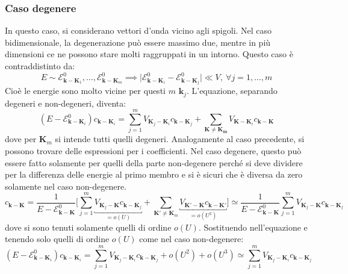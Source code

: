 \documentclass[10pt, a4paper]{scrartcl}
\numberwithin{equation}{subsection}
\theoremstyle{style1}
\begin{document}
\subsubsection{Caso degenere}

In questo caso, si considerano vettori d'onda vicino agli spigoli. Nel caso bidimensionale, la degenerazione pu\`o essere massimo due, mentre in pi\`u dimensioni ce ne possono stare molti raggruppati in un intorno. Questo caso \`e contraddistinto da:
\begin{equation}
	E \sim \mathscr{E}^0_{\mathbf{k} - \mathbf{K} _1} , \ldots, \mathscr{E}^0_{\mathbf{k} -\mathbf{K} _m} \implies \lvert \mathscr{E}^0_{\mathbf{k} - \mathbf{K} _i} - \mathscr{E}^0_{\mathbf{k} - \mathbf{K} _j}  \rvert \ll V ,  \ \forall j=1,\ldots,m  
\end{equation}
Cio\`e le energie sono molto vicine per questi $m$ $\mathbf{k} _j$. L'equazione, separando degeneri e non-degeneri, diventa:
\begin{equation}
	(E-\mathscr{E}^0_{\mathbf{k} -\mathbf{K} _i}) c_{\mathbf{k} -\mathbf{K} _i} = \sum_{j=1}^{m} V_{\mathbf{K} _j - \mathbf{K} _i} c_{\mathbf{k} -\mathbf{K} _j} + \sum_{\mathbf{K} \neq \mathbf{K_m} }^{} V_{\mathbf{K} -\mathbf{K} _i} c_{\mathbf{k} -\mathbf{K} } 
\end{equation}
dove per $\mathbf{K} _m$ si intende tutti quelli degeneri. Analogamente al caso precedente, si possono trovare delle espressioni per i coefficienti. Nel caso degenere, questo pu\`o essere fatto solamente per quelli della parte non-degenere perch\'e si deve dividere per la differenza delle energie al primo membro e si \`e sicuri che \`e diversa da zero solamente nel caso non-degenere.
\begin{equation}
	c_{\mathbf{k} -\mathbf{K} } = \frac{1}{E- \mathscr{E}^0_{\mathbf{k} - \mathbf{K} } } \Bigg[ \sum_{j=1}^{m}\underbracket{ V_{\mathbf{K} _j - \mathbf{K}} c_{\mathbf{k} -\mathbf{K} _j}}_{=o(U)}   + \sum_{\mathbf{K}' \neq \mathbf{K} _m}^{} \underbracket{V_{\mathbf{K} ' - \mathbf{K} } c_{\mathbf{k} -\mathbf{K} '} }_{= o(U^2)}   \Bigg] \simeq \frac{1}{E - \mathscr{E}^0_{\mathbf{k} - \mathbf{K} } } \sum_{j=1}^{m} V_{\mathbf{K} _j - \mathbf{K} } c_{\mathbf{k} - \mathbf{K} _j} 
\end{equation}
dove si sono tenuti solamente quelli di ordine $o(U)$. Sostituendo nell'equazione e tenendo solo quelli di ordine $o(U)$ come nel caso non-degenere:
\begin{equation}
	(E-\mathscr{E}^0_{\mathbf{k} - \mathbf{K} _i} ) c_{\mathbf{k} - \mathbf{K} _i} = \sum_{j=1}^{m} V_{\mathbf{K} _j - \mathbf{K} _i} c_{\mathbf{k} -\mathbf{K} _j} + o(U^2) + o(U^3) \simeq \sum_{j=1}^{m} V_{\mathbf{K} _j - \mathbf{K} _i} c_{\mathbf{k} -\mathbf{K} _j}
\end{equation}
\end{document}
